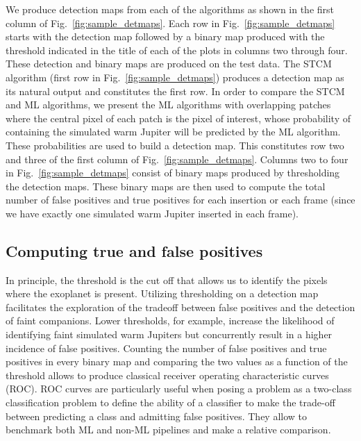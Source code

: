 \documentclass{aa}
\begin{document}
We produce detection maps from each of the algorithms as shown in the first column of Fig.~\ref{fig:sample_detmaps}.
Each row in Fig.~\ref{fig:sample_detmaps} starts with the detection map followed by a binary map produced with the threshold indicated in the title of each of the plots in columns two through four.
These detection and binary maps are produced on the test data.
The STCM algorithm (first row in Fig.~\ref{fig:sample_detmaps}) produces a detection map as its natural output and constitutes the first row.
In order to compare the STCM and ML algorithms, we present the ML algorithms with overlapping patches where the central pixel of each patch is the pixel of interest, whose probability of containing the simulated warm Jupiter will be predicted by the ML algorithm.
These probabilities are used to build a detection map.
This constitutes row two and three of the first column of Fig.~\ref{fig:sample_detmaps}.
Columns two to four in Fig.~\ref{fig:sample_detmaps} consist of binary maps produced by thresholding the detection maps.
These binary maps are then used to compute the total number of false positives and true positives for each insertion or each frame (since we have exactly one simulated warm Jupiter inserted in each frame).


\subsection{Computing true and false positives}
\label{sec:TPFP}

In principle, the threshold is the cut off that allows us to identify the pixels where the exoplanet is present.
Utilizing thresholding on a detection map facilitates the exploration of the tradeoff between false positives and the detection of faint companions. Lower thresholds, for example, increase the likelihood of identifying faint simulated warm Jupiters but concurrently result in a higher incidence of false positives.
Counting the number of false positives and true positives in every binary map and comparing the two values as a function of the threshold allows to produce classical receiver operating characteristic curves (ROC). 
ROC curves are particularly useful when posing a problem as a two-class classification problem to define the ability of a classifier to make the trade-off between predicting a class and admitting false positives.
They allow to benchmark both ML and non-ML pipelines and make a relative comparison. 
\end{document}
